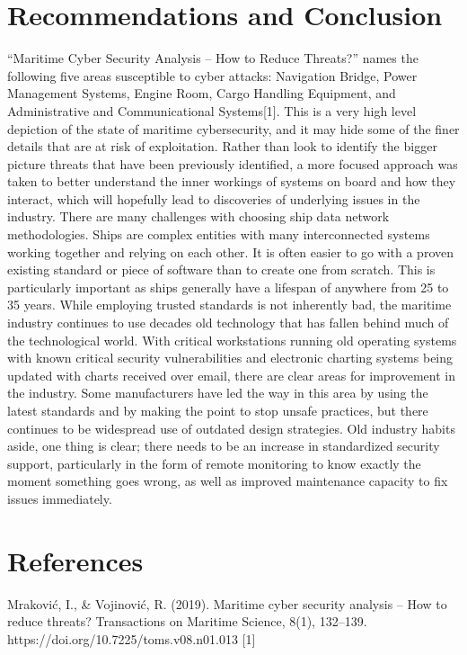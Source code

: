 \documentclass{report}
\begin{document}
\chapter {Recommendations and Conclusion}

“Maritime Cyber Security Analysis – How to Reduce Threats?” names the following five areas susceptible to cyber attacks: Navigation Bridge, Power Management Systems, Engine Room, Cargo Handling Equipment, and Administrative and Communicational Systems[1]. This is a very high level depiction of the state of maritime cybersecurity, and it may hide some of the finer details that are at risk of exploitation. Rather than look to identify the bigger picture threats that have been previously identified, a more focused approach was taken to better understand the inner workings of systems on board and how they interact, which will hopefully lead to discoveries of underlying issues in the industry.
\vspace{5mm} %
There are many challenges with choosing ship data network methodologies. Ships are complex entities with many interconnected systems working together and relying on each other. It is often easier to go with a proven existing standard or piece of software than to create one from scratch. This is particularly important as ships generally have a lifespan of anywhere from 25 to 35 years. While employing trusted standards is not inherently bad, the maritime industry continues to use decades old technology that has fallen behind much of the technological world. With critical workstations running old operating systems with known critical security vulnerabilities and electronic charting systems being updated with charts received over email, there are clear areas for improvement in the industry. Some manufacturers have led the way in this area by using the latest standards and by making the point to stop unsafe practices, but there continues to be widespread use of outdated design strategies. Old industry habits aside, one thing is clear; there needs to be an increase in standardized security support, particularly in the form of remote monitoring to know exactly the moment something goes wrong, as well as improved maintenance capacity to fix issues immediately. 
\chapter{References}

Mraković, I., \& Vojinović, R. (2019). Maritime cyber security analysis – How to reduce threats? Transactions on Maritime Science, 8(1), 132–139. https://doi.org/10.7225/toms.v08.n01.013 [1]
\end{document}
